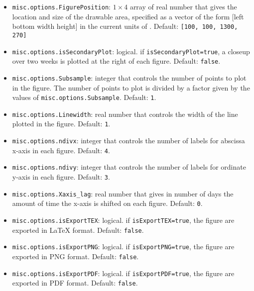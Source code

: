 \begin{itemize}
\begin{itemize}
\item \lstinline[basicstyle = \mlttfamily \small ]!misc.options.FigurePosition!: $1\times4$ array of real number that gives the location and size of the drawable area, specified as a vector of the form [left bottom width height] in the current units of \MATLAB{}. Default: \lstinline[basicstyle = \mlttfamily \small ]![100, 100, 1300, 270]!
\item \lstinline[basicstyle = \mlttfamily \small ]!misc.options.isSecondaryPlot!: logical. if \lstinline[basicstyle = \mlttfamily \small ]!isSecondaryPlot=true!, a closeup over two weeks is plotted at the right of each figure. Default: \lstinline[basicstyle = \mlttfamily \small ]!false!.
\item \lstinline[basicstyle = \mlttfamily \small ]!misc.options.Subsample!: integer that controls the number of points to plot in the figure. The number of points to plot is divided by a factor given by the values of \lstinline[basicstyle = \mlttfamily \small ]!misc.options.Subsample!. Default: \lstinline[basicstyle = \mlttfamily \small ]!1!.
\item \lstinline[basicstyle = \mlttfamily \small ]!misc.options.Linewidth!: real number that controls the width of the line plotted in the figure. Default: \lstinline[basicstyle = \mlttfamily \small ]!1!.
\item \lstinline[basicstyle = \mlttfamily \small ]!misc.options.ndivx!: integer that controls the number of labels for abscissa x-axis in each figure. Default: \lstinline[basicstyle = \mlttfamily \small ]!4!.
\item \lstinline[basicstyle = \mlttfamily \small ]!misc.options.ndivy!: integer that controls the number of labels for ordinate y-axis in each figure. Default: \lstinline[basicstyle = \mlttfamily \small ]!3!.
\item \lstinline[basicstyle = \mlttfamily \small ]!misc.options.Xaxis_lag!: real number that gives in number of days the amount of time the x-axis is shifted on each figure. Default: \lstinline[basicstyle = \mlttfamily \small ]!0!. 
\item \lstinline[basicstyle = \mlttfamily \small ]!misc.options.isExportTEX!: logical. if \lstinline[basicstyle = \mlttfamily \small ]!isExportTEX=true!, the figure are exported in \LaTeX{} format. Default: \lstinline[basicstyle = \mlttfamily \small ]!false!.
\item \lstinline[basicstyle = \mlttfamily \small ]!misc.options.isExportPNG!: logical. if \lstinline[basicstyle = \mlttfamily \small ]!isExportPNG=true!, the figure are exported in PNG format. Default: \lstinline[basicstyle = \mlttfamily \small ]!false!.
\item \lstinline[basicstyle = \mlttfamily \small ]!misc.options.isExportPDF!: logical. if \lstinline[basicstyle = \mlttfamily \small ]!isExportPDF=true!, the figure are exported in PDF format. Default: \lstinline[basicstyle = \mlttfamily \small ]!false!.
\end{itemize}
\end{itemize}